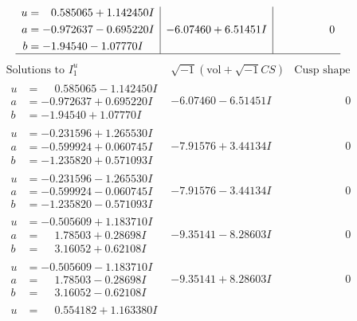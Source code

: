\documentclass[1p]{elsarticle_modified}
\theoremstyle{definition}
\newcommand{\I}{\sqrt{-1}}
\begin{document}
$$\begin{array}{c|c|c}
\begin{aligned}
u &= \phantom{-}0.585065 + 1.142450 I \\
a &= -0.972637 - 0.695220 I \\
b &= -1.94540 - 1.07770 I\end{aligned}
 & -6.07460 + 6.51451 I & \phantom{-0.000000 } 0\\
 \hline 
 \end{array}$$\newpage$$\begin{array}{c|c|c}  
\text{Solutions to }I^u_{1}& \I (\text{vol} + \sqrt{-1}CS) & \text{Cusp shape}\\
 \hline 
\begin{aligned}
u &= \phantom{-}0.585065 - 1.142450 I \\
a &= -0.972637 + 0.695220 I \\
b &= -1.94540 + 1.07770 I\end{aligned}
 & -6.07460 - 6.51451 I & \phantom{-0.000000 } 0 \\ \hline\begin{aligned}
u &= -0.231596 + 1.265530 I \\
a &= -0.599924 + 0.060745 I \\
b &= -1.235820 + 0.571093 I\end{aligned}
 & -7.91576 + 3.44134 I & \phantom{-0.000000 } 0 \\ \hline\begin{aligned}
u &= -0.231596 - 1.265530 I \\
a &= -0.599924 - 0.060745 I \\
b &= -1.235820 - 0.571093 I\end{aligned}
 & -7.91576 - 3.44134 I & \phantom{-0.000000 } 0 \\ \hline\begin{aligned}
u &= -0.505609 + 1.183710 I \\
a &= \phantom{-}1.78503 + 0.28698 I \\
b &= \phantom{-}3.16052 + 0.62108 I\end{aligned}
 & -9.35141 - 8.28603 I & \phantom{-0.000000 } 0 \\ \hline\begin{aligned}
u &= -0.505609 - 1.183710 I \\
a &= \phantom{-}1.78503 - 0.28698 I \\
b &= \phantom{-}3.16052 - 0.62108 I\end{aligned}
 & -9.35141 + 8.28603 I & \phantom{-0.000000 } 0 \\ \hline\begin{aligned}
u &= \phantom{-}0.554182 + 1.163380 I \\

\end{aligned}
\end{array}$$
\end{document}
